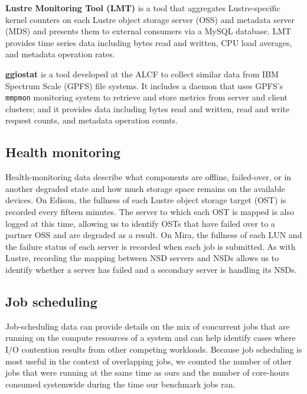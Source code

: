 \label{sec:methods/lmt}
\textbf{Lustre Monitoring Tool (LMT)} is a tool that aggregates Lustre-specific kernel counters on each Lustre object storage server (OSS) and metadata server (MDS) and presents them to external consumers via a MySQL database.
LMT provides time series data including bytes read and written, CPU load averages, and metadata operation rates.

\label{sec:methods/ggiostat}
\textbf{ggiostat} is a tool developed at the ALCF to collect similar data from IBM Spectrum Scale (GPFS) file systems.
It includes a daemon that uses GPFS's \texttt{mmpmon} monitoring system to retrieve and store metrics from server and client clusters; and it provides data including bytes read and written, read and write request counts, and metadata operation counts.

\subsection{Health monitoring} \label{sec:methods/health}

Health-monitoring data describe what components are offline, failed-over, or in another degraded state and how much storage space remains on the available devices.
On Edison, the fullness of each Lustre object storage target (OST) is recorded every fifteen minutes.  The server to which each OST is mapped is also logged at this time, allowing us to identify OSTs that have failed over to a partner OSS and are degraded as a result.
On Mira, the fullness of each LUN and the failure status of each server is recorded when each job is submitted.
As with Lustre, recording the mapping between NSD servers and NSDs allows us to identify whether a server has failed and a secondary server is handling its NSDs.

\subsection{Job scheduling} \label{sec:methods/scheduling}

Job-scheduling data can provide details on the mix of concurrent jobs that are running on the compute resources of a system and can help identify cases where I/O contention results from other competing workloads.
Because job scheduling is most useful in the context of overlapping jobs, we counted the number of other jobs that were running at the same time as ours and the number of core-hours consumed systemwide during the time our benchmark jobs ran.

